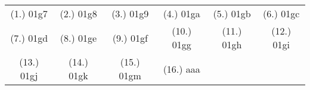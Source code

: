 \begin{eocexercises}{}



\par \practiceinfo
\par \begin{tabular}[h]{cccccc}
(1.)	01g7	&
(2.)	01g8	&
(3.)	01g9	&
(4.)	01ga	&
(5.)	01gb	&
(6.)	01gc	\\ %
(7.)	01gd	&
(8.)	01ge	&
(9.)	01gf	&
(10.)	01gg	&
(11.)	01gh	&
(12.)	01gi	\\ %
(13.)	01gj	&
(14.)	01gk	&
(15.)	01gm	&
(16.)	aaa	&
\end{tabular}
\end{eocexercises}
